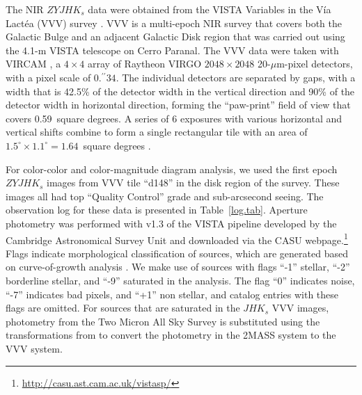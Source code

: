 \documentclass[twocolumn,tighten]{aastex61}
\begin{document}
The NIR $ZYJHK_s$ data were obtained from the VISTA Variables in the V\'ia Lact\'ea (VVV) survey \citep{2010NewA...15..433M,2012A&A...537A.107S}. VVV is a multi-epoch NIR survey that covers both the Galactic Bulge and an adjacent Galactic Disk region that was carried out using the 4.1-m VISTA telescope on Cerro Paranal. The VVV data were taken with VIRCAM \citep[VISTA Infrared CAMera;][]{2006SPIE.6269E..0XD}, a $4\times4$ array of Raytheon VIRGO $2048\times2048$ 20-$\mu$m-pixel detectors, with a pixel scale of $0.\!^{\prime\prime}34$. The individual detectors are separated by gaps, with a width that is 42.5\% of the detector width in the vertical direction and 90\% of the detector width in horizontal direction, forming the ``paw-print'' field of view that covers 0.59~square degrees. A series of 6 exposures with various horizontal and vertical shifts combine to form a single rectangular tile with an area of $1.5^\circ\times1.1^\circ=1.64$~square degrees \citep{2012A&A...537A.107S}. 

For color-color and color-magnitude diagram analysis, we used the first epoch $ZYJHK_s$ images from VVV tile ``d148'' in the disk region of the survey. These images all had top ``Quality Control'' grade and sub-arcsecond seeing. The observation log for these data is presented in Table~\ref{log.tab}. Aperture photometry was performed with v1.3 of the VISTA pipeline developed by the Cambridge Astronomical Survey Unit \citep[CASU;][]{2010ASPC..434...91L} and downloaded via the CASU webpage.\footnote{\url{http://casu.ast.cam.ac.uk/vistasp/}} Flags indicate morphological classification of sources, which are generated based on curve-of-growth analysis \citep{2004SPIE.5493..411I}. We make use of sources with flags ``-1'' stellar, ``-2'' borderline stellar, and ``-9'' saturated in the analysis. The flag ``0'' indicates noise, ``-7'' indicates bad pixels, and ``+1'' non stellar, and catalog entries with these flags are omitted. For sources that are saturated in the $JHK_s$ VVV images, photometry from the Two Micron All Sky Survey \citep[2MASS;][]{2006AJ....131.1163S} is substituted using the transformations from \citet{2013A&A...552A.101S} to convert the photometry in the 2MASS system to the VVV system. 
\end{document}
